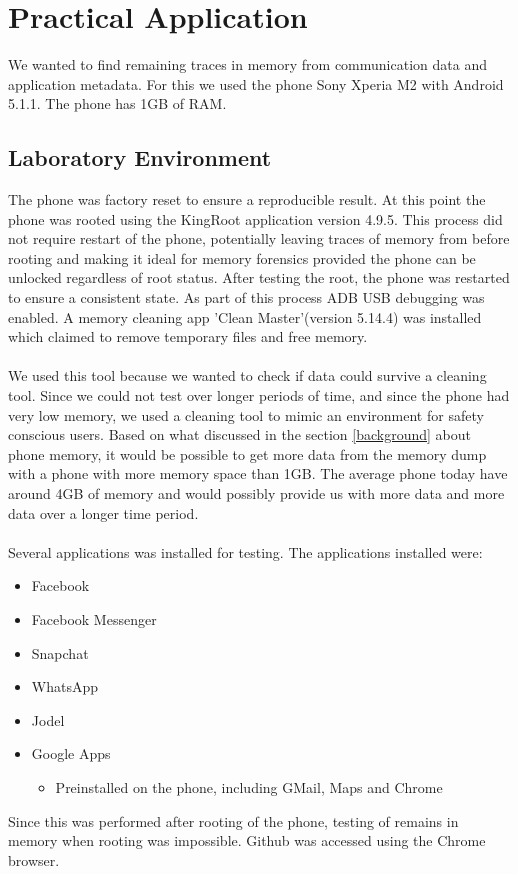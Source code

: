 \section{Practical Application}
We wanted to find remaining traces in memory from communication data and application metadata. For this we used the phone Sony Xperia M2 with Android 5.1.1. The phone has 1GB of RAM.

\subsection{Laboratory Environment}
The phone was factory reset to ensure a reproducible result. At this point the phone was rooted using the KingRoot application version 4.9.5. This process did not require restart of the phone, potentially leaving traces of memory from before rooting and making it ideal for memory forensics provided the phone can be unlocked regardless of root status. After testing the root, the phone was restarted to ensure a consistent state. As part of this process ADB USB debugging was enabled. A memory cleaning app 'Clean Master'(version 5.14.4) was installed which claimed to remove temporary files and free memory.\\\\ %
We used this tool because we wanted to check if data could survive a cleaning tool. Since we could not test over longer periods of time, and since the phone had very low memory, we used a cleaning tool to mimic an environment for safety conscious users. Based on what discussed in the section \ref{background} about phone memory, it would be possible to get more data from the memory dump with a phone with more memory space than 1GB. The average phone today have around 4GB of memory and would possibly provide us with more data and more data over a longer time period.\\\\Several applications was installed for testing. The applications installed were:
\begin{description}
\begin{itemize}
\item{Facebook}
\item{Facebook Messenger}
\item{Snapchat}
\item{WhatsApp}
\item{Jodel}
\item{Google Apps}
\begin{itemize}
\item{Preinstalled on the phone, including GMail, Maps and Chrome} %
\end{itemize}
\end{itemize}
\end{description}
Since this was performed after rooting of the phone, testing of remains in memory when rooting was impossible. Github was accessed using the Chrome browser.
